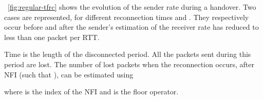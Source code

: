 \documentclass[twocolumn]{nictatechreport}
\begin{document}
\figurename~\ref{fig:regular-tfrc} shows the evolution of the sender rate during
a handover. Two cases are represented, for different reconnection times 
and . They respectively occur before and after the sender's
estimation of the receiver rate has reduced to less than one packet per RTT.

Time  is the length of the disconnected period.  All the
packets sent during this period are lost.  The number of lost packets when the
reconnection occurs, after  NFI (such that
), can be estimated using

where  is the index of the  NFI and
 is the floor operator.


\begin{figure*}[tb]
\end{figure*}
\end{document}

